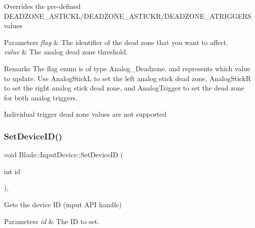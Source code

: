 Overrides the pre-\/defined D\+E\+A\+D\+Z\+O\+N\+E\+\_\+\+A\+S\+T\+I\+C\+K\+L/\+D\+E\+A\+D\+Z\+O\+N\+E\+\_\+\+A\+S\+T\+I\+C\+K\+R/\+D\+E\+A\+D\+Z\+O\+N\+E\+\_\+\+A\+T\+R\+I\+G\+G\+E\+RS values 
\begin{DoxyParams}{Parameters}
{\em flag} & The identifier of the dead zone that you want to affect. \\
\hline
{\em value} & The analog dead zone threshold. \\
\hline
\end{DoxyParams}
\begin{DoxyRemark}{Remarks}
The flag enum is of type Analog\+\_\+\+Deadzone, and represents which value to update. Use Analog\+StickL to set the left analog stick dead zone, Analog\+StickR to set the right analog stick dead zone, and Analog\+Trigger to set the dead zone for both analog triggers. 

Individual trigger dead zone values are not supported 
\end{DoxyRemark}
\mbox{\label{class_blade_1_1_input_device_aa61d2df62fef1370b09ffb7469fc5da4}} 
\subsubsection{\texorpdfstring{Set\+Device\+I\+D()}{SetDeviceID()}}
{\footnotesize\ttfamily void Blade\+::\+Input\+Device\+::\+Set\+Device\+ID (\begin{DoxyParamCaption}\item[{int}]{id }\end{DoxyParamCaption})\hspace{0.3cm}{\ttfamily [inline]}, {\ttfamily [protected]}}



Gets the device ID (input A\+PI handle) 


\begin{DoxyParams}{Parameters}
{\em id} & The ID to set. \\
\hline
\end{DoxyParams}
\mbox{\label{class_blade_1_1_input_device_ab810d1917cee9709b339db1074d10e9a}} 
